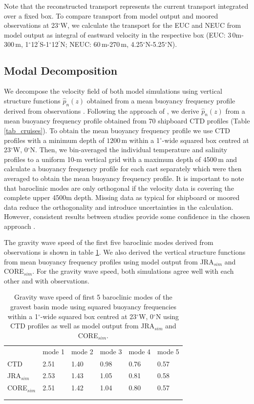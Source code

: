 \documentclass[os, manuscript]{copernicus}
\begin{document}
Note that the reconstructed transport represents the current transport integrated over a fixed box. To compare transport from model output and moored observations at 23$^{\circ}$W, we calculate the transport for the EUC and NEUC from model output as integral of eastward velocity in the respective box (EUC: 3$\,$0m-300$\,$m, 1$^{\circ}$12$^\prime$S-1$^{\circ}$12$^\prime$N; NEUC: 60$\,$m-270$\,$m, 4.25$^{\circ}$N-5.25$^{\circ}$N). 


\subsection{Modal Decomposition}
We decompose the velocity field of both model simulations using vertical structure functions $ \hat{p}_n(z) $ obtained from a mean buoyancy frequency profile derived from observations \citep{Brandt2016}. Following the approach of \cite{Claus2016a}, we derive $ \hat{p}_n(z) $ from a mean buoyancy frequency profile obtained from 70 shipboard CTD profiles (Table \ref{tab_cruises}). To obtain the mean buoyancy frequency profile we use CTD profiles with a minimum depth of $ 1200\, $m within a 1$^{\circ}$-wide squared box centred at 23$^{\circ}$W, 0$^{\circ}$N. Then, we bin-averaged the individual temperature and salinity profiles to a uniform 10-m vertical grid with a maximum depth of 4500$\,$m and calculate a buoyancy frequency profile for each cast separately which were then averaged to obtain the mean buoyancy frequency profile. It is important to note that baroclinic modes are only orthogonal if the velocity data is covering the complete upper 4500m depth. Missing data as typical for shipboard or moored data reduce the orthogonality and introduce uncertainties in the calculation. However, consistent results between studies provide some confidence in the chosen approach \citep[e.g. ][]{Brandt2016, Claus2016a, Kopte2018}.

The gravity wave speed of the first five baroclinic modes derived from observations is shown in table \ref{tab_modes_c}. We also derived the vertical structure functions from mean buoyancy frequency profiles using model output from JRA$_{sim}$ and CORE$_{sim}$. For the gravity wave speed, both simulations agree well with each other and with observations.

\begin{table}[t]
	\caption{Gravity wave speed of first 5 baroclinic modes of the gravest basin mode using squared buoyancy frequencies within a 1$^{\circ}$-wide squared box centred at 23$^{\circ}$W, 0$^{\circ}$N using CTD profiles as well as model output from JRA$_{sim}$ and CORE$_{sim}$.}
	\begin{tabular}{llllll}
		\tophline
		& mode 1 & mode 2 & mode 3 & mode 4 & mode 5 \\
		\middlehline
		CTD  & 2.51 & 1.40 & 0.98 & 0.76 & 0.57 \\
		JRA$_{sim}$  & 2.53 & 1.43 & 1.05 & 0.81 & 0.58 \\
		CORE$_{sim}$ & 2.51 & 1.42 & 1.04 & 0.80 & 0.57 \\
		 \\
		\bottomhline
	\end{tabular}
	\label{tab_modes_c}
	\belowtable{ } %
\end{table}
\end{document}
